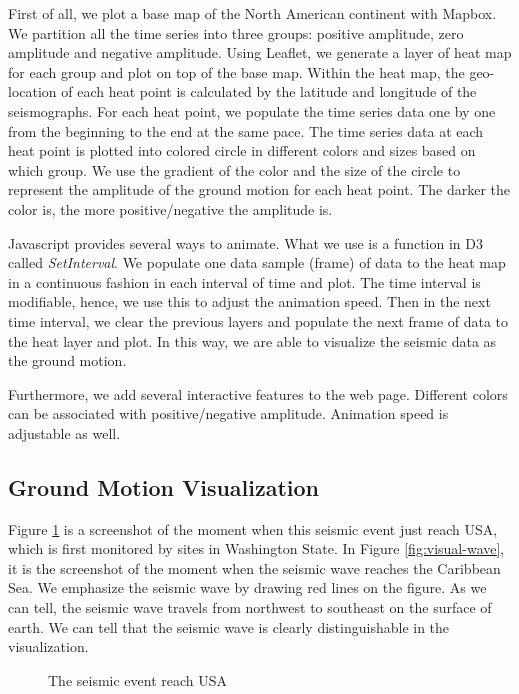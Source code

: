 \documentclass[9pt,twocolumn,twoside]{../../styles/osajnl}
\begin{document}
First of all, we plot a base map of the North American continent with Mapbox. We partition all the time series into three groups: positive amplitude, zero amplitude and negative amplitude. Using Leaflet, we generate a layer of heat map for each group and plot on top of the base map. Within the heat map, the geo-location of each heat point is calculated by the latitude and longitude of the seismographs. For each heat point, we populate the time series data one by one from the beginning to the end at the same pace. The time series data at each heat point is plotted into colored circle in different colors and sizes based on which group. We use the gradient of the color and the size of the circle to represent the amplitude of the ground motion for each heat point. The darker the color is, the more positive/negative the amplitude is.

Javascript provides several ways to animate. What we use is a function in D3 called \textit{SetInterval}. We populate one data sample (frame) of data to the heat map in a continuous fashion in each interval of time and plot. The time interval is modifiable, hence, we use this to adjust the animation speed. Then in the next time interval, we clear the previous layers and populate the next frame of data to the heat layer and plot. In this way, we are able to visualize the seismic data as the ground motion.

Furthermore, we add several interactive features to the web page. Different colors can be associated with positive/negative amplitude. Animation speed is adjustable as well.

\subsection{Ground Motion Visualization}

Figure \ref{fig:visual-static} is a screenshot of the moment when this seismic event just reach USA, which is first monitored by sites in Washington State. In Figure \ref{fig:visual-wave}, it is the screenshot of the moment when the seismic wave reaches the Caribbean Sea. We emphasize the seismic wave by drawing red lines on the figure. As we can tell, the seismic wave travels from northwest to southeast on the surface of earth. We can tell that the seismic wave is clearly distinguishable in the visualization.

\begin{figure}[htbp]
\centering
{}
\caption{The seismic event reach USA}
\label{fig:visual-static}
\end{figure}
\end{document}

